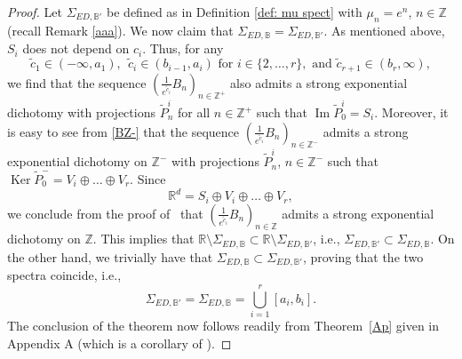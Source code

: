 \documentclass[reqno, a4paper, 10pt]{amsart}
\theoremstyle{plain}
\numberwithin{equation}{section}
\theoremstyle{remark}
\DeclareMathOperator{\Ima}{Im}
\DeclareMathOperator{\Ker}{Ker}
\def\R{\mathbb{R}}
\def\Z{\mathbb{Z}}
\begin{document}
\begin{proof}
Let $\Sigma_{ED, \mathbb B'}$ be defined as in Definition \ref{def: mu spect} with $\mu_n=e^n$, $n\in \Z$ (recall Remark \ref{aaa}).
We now claim that $\Sigma_{ED, \mathbb B}=\Sigma_{ED, \mathbb B'}$. As mentioned above, $S_i$ does not depend on $c_i$. Thus, for any
\[
\tilde c_1 \in (-\infty, a_1), ~~\tilde c_i\in (b_{i-1}, a_{i}) \text{ for } i\in \{2,\ldots ,r\}, \text{ and }  \tilde c_{r+1}\in (b_r, \infty),
\]
we find that the sequence $(\frac {1}{e^{\tilde c_i}}B_n)_{n\in \Z^+}$ also admits a strong exponential dichotomy with projections $\tilde P_n^i$ for all $n\in \Z^+$ such that
$\Ima \tilde P_0^i=S_{i}$. Moreover, it is easy to see from \eqref{BZ-} that the sequence $\left(\frac {1}{e^{\tilde c_i}}B_n\right)_{n\in \Z^-}$ admits a strong exponential dichotomy on $\Z^-$ with projections $\tilde P_n^i$, $n\in \Z^-$ such that $\Ker \tilde P_0^-=V_{i} \oplus \ldots \oplus V_r$. Since
\[
\R^d=S_{i}\oplus V_{i} \oplus \ldots \oplus V_r,
\]
we conclude from the proof of~\cite[Theorem 2.3]{BDV0} that $(\frac {1}{e^{\tilde c_i}}B_n)_{n\in \Z}$ admits a strong exponential dichotomy on $\Z$.
This implies that $\R \setminus \Sigma_{ED, \mathbb B} \subset \R \setminus \Sigma_{ED, \mathbb B'}$, i.e., $\Sigma_{ED, \mathbb B'}\subset \Sigma_{ED, \mathbb B}$. On the other hand, we trivially have that $\Sigma_{ED, \mathbb B}\subset \Sigma_{ED, \mathbb B'}$, proving that the two spectra coincide, i.e.,
\[
\Sigma_{ED, \mathbb B'}
=\Sigma_{ED, \mathbb B}
=\bigcup_{i=1}^r [a_i, b_i].
\]
The conclusion of the theorem now follows readily from Theorem~\ref{Ap} given in Appendix A (which is a corollary of \cite[Theorem 2]{DZZ}).
\end{proof}
\end{document}
